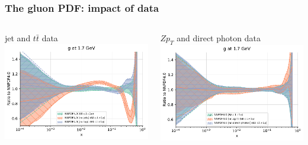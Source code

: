 \documentclass{beamer}
\begin{document}
\begin{frame}
 \frametitle{The gluon PDF: impact of data}
 \footnotesize
 \centering
 \vspace{0.1cm}
 \begin{columns}[c]
  \begin{column}{0.5\textwidth}
   \centering
   jet and $t\bar{t}$ data\\
   \includegraphics[width=\columnwidth]{plots/gluon_1}\\
  \end{column}
  \begin{column}{0.5\textwidth}
   \centering
   $Zp_T$ and direct photon data\\
   \includegraphics[width=\columnwidth]{plots/gluon_2}\\ 
  \end{column}
 \end{columns}

\end{frame}
\end{document}
